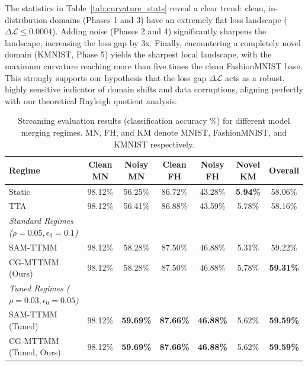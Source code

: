 \documentclass{article}
\theoremstyle{plain}
\theoremstyle{definition}
\theoremstyle{remark}
\begin{document}
The statistics in Table~\ref{tab:curvature_stats} reveal a clear trend: clean, in-distribution domains (Phases 1 and 3) have an extremely flat loss landscape ($\Delta \mathcal{L} \le 0.0004$). Adding noise (Phases 2 and 4) significantly sharpens the landscape, increasing the loss gap by 3x. Finally, encountering a completely novel domain (KMNIST, Phase 5) yields the sharpest local landscape, with the maximum curvature reaching more than five times the clean FashionMNIST base. This strongly supports our hypothesis that the loss gap $\Delta \mathcal{L}$ acts as a robust, highly sensitive indicator of domain shifts and data corruptions, aligning perfectly with our theoretical Rayleigh quotient analysis.

\begin{table}[t]
\caption{Streaming evaluation results (classification accuracy \%) for different model merging regimes. MN, FH, and KM denote MNIST, FashionMNIST, and KMNIST respectively.}
\label{tab:results_table}
\vskip 0.15in
\begin{center}
\begin{small}
\begin{sc}
\begin{tabular}{lcccccc}
\toprule
\textbf{Regime} & \textbf{Clean MN} & \textbf{Noisy MN} & \textbf{Clean FH} & \textbf{Noisy FH} & \textbf{Novel KM} & \textbf{Overall} \\
\midrule
Static           & 98.12\% & 56.25\% & 86.72\% & 43.28\% & \textbf{5.94\%} & 58.06\% \\
TTA              & 98.12\% & 56.41\% & 86.88\% & 43.59\% & 5.78\% & 58.16\% \\
\midrule
\textit{Standard Regimes ($\rho=0.05, \epsilon_0=0.1$)}\\
SAM-TTMM         & 98.12\% & 58.28\% & 87.50\% & 46.88\% & 5.31\% & 59.22\% \\
CG-MTTMM (Ours)  & 98.12\% & 58.28\% & 87.50\% & 46.88\% & 5.78\% & \textbf{59.31\%} \\
\midrule
\textit{Tuned Regimes ($\rho=0.03, \epsilon_0=0.05$)}\\
SAM-TTMM (Tuned) & 98.12\% & \textbf{59.69\%} & \textbf{87.66\%} & \textbf{46.88\%} & 5.62\% & \textbf{59.59\%} \\
CG-MTTMM (Tuned, Ours) & 98.12\% & \textbf{59.69\%} & \textbf{87.66\%} & \textbf{46.88\%} & 5.62\% & \textbf{59.59\%} \\
\bottomrule
\end{tabular}
\end{sc}
\end{small}
\end{center}
\vskip -0.1in
\end{table}
\end{document}
